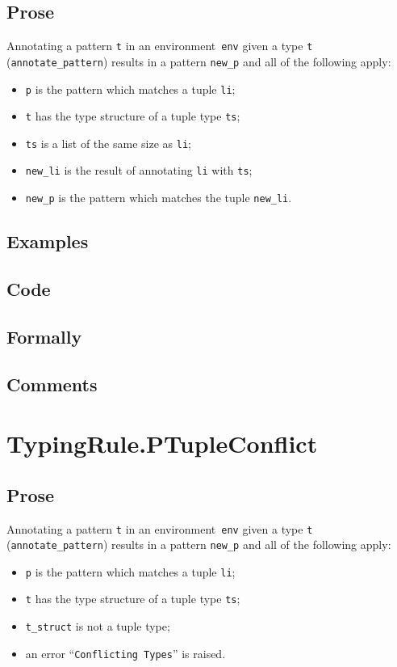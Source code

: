 \documentclass{book}
\begin{document}
  \subsection{Prose}
   Annotating a pattern \texttt{t} in an environment~\texttt{env} given a type \texttt{t} (\texttt{annotate\_pattern}) results in a pattern \texttt{new\_p} and all of the following apply:
   \begin{itemize}
   \item \texttt{p} is the pattern which matches a tuple \texttt{li};
   \item \texttt{t} has the type structure of a tuple type \texttt{ts};
   \item \texttt{ts} is a list of the same size as \texttt{li};  
   \item \texttt{new\_li} is the result of annotating \texttt{li} with \texttt{ts};
   \item \texttt{new\_p} is the pattern which matches the tuple \texttt{new\_li}.
   \end{itemize}

  \subsection{Examples}

  \subsection{Code}

  \subsection{Formally}

  \subsection{Comments}


\section{TypingRule.PTupleConflict \label{sec:TypingRule.PTupleConflict}}

  \subsection{Prose}
   Annotating a pattern \texttt{t} in an environment~\texttt{env} given a type \texttt{t} (\texttt{annotate\_pattern}) results in a pattern \texttt{new\_p} and all of the following apply:
   \begin{itemize}
   \item \texttt{p} is the pattern which matches a tuple \texttt{li};
   \item \texttt{t} has the type structure of a tuple type \texttt{ts};
   \item \texttt{t\_struct} is not a tuple type;
   \item an error ``\texttt{Conflicting Types}'' is raised. 
   \end{itemize}
\end{document}
